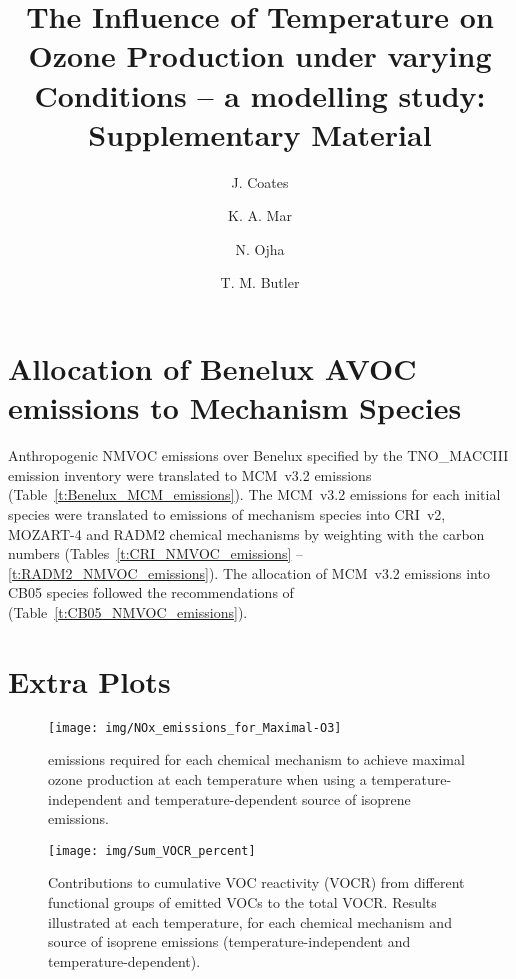 \documentclass[11pt,a4paper]{article}
\title{The Influence of Temperature on Ozone Production under varying \ce{NO_x} Conditions -- a modelling study: Supplementary Material}
\author[1]{J. Coates}
\author[1]{K. A. Mar}
\author[2]{N. Ojha}
\author[1]{T. M. Butler}
\affil[1]{Institute for Advanced Sustainability Studies, Potsdam, Germany}
\affil[2]{Atmospheric Chemistry Department, Max Planck Institute for Chemistry, Mainz, Germany}
\begin{document}
\maketitle

\section{Allocation of Benelux AVOC emissions to Mechanism Species}
Anthropogenic NMVOC emissions over Benelux specified by the TNO\_MACCIII emission inventory \citep{Kuenen:2014} were translated to MCM~v3.2 emissions (Table~\ref{t:Benelux_MCM_emissions}).
The MCM~v3.2 emissions for each initial species were translated to emissions of mechanism species into CRI~v2, MOZART-4 and RADM2 chemical mechanisms by weighting with the carbon numbers (Tables~\ref{t:CRI_NMVOC_emissions} -- \ref{t:RADM2_NMVOC_emissions}).
The allocation of MCM~v3.2 emissions into CB05 species followed the recommendations of \citet{Yarwood:2005} (Table~\ref{t:CB05_NMVOC_emissions}).
{
    \begin{landscape}%
        \centering%
        
    \end{landscape}%
}
\newpage
{
    \centering%
    
}
\newpage
{
    \centering%
    
}
\newpage
{
    \centering%
    
}
\newpage
{
    \centering%
    
}

\clearpage

\section{Extra Plots}
\begin{figure}[ht]
    \centering
    \caption{ emissions required for each chemical mechanism to achieve maximal ozone production at each temperature when using a temperature-independent and temperature-dependent source of isoprene emissions.}
    \texttt{[image: img/NOx\_emissions\_for\_Maximal-O3]}
\end{figure}

\begin{figure}[ht]
    \centering
    \caption{Contributions to cumulative VOC reactivity (VOCR) from different functional groups of emitted VOCs to the total VOCR. Results illustrated at each temperature, for each chemical mechanism and source of isoprene emissions (temperature-independent and temperature-dependent).}
    \texttt{[image: img/Sum\_VOCR\_percent]}
\end{figure}
\end{document}

